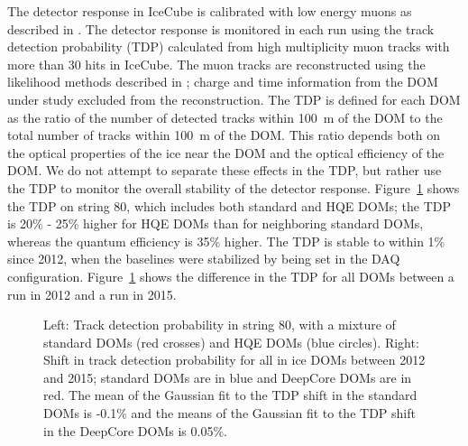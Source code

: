 The detector response in IceCube is calibrated with low energy muons as
described in \cite{IC3:ereco}. The detector response is monitored in each run using the track
detection probability (TDP) calculated from high
multiplicity muon tracks with more than 30 hits in IceCube. The muon
tracks are reconstructed using the likelihood methods described in
\cite{IC3:ereco}; charge and time information from the DOM under study excluded
from the reconstruction. The TDP is
defined for each DOM as the ratio of the number of detected tracks
within 100~m of the DOM to the total number of tracks within 100~m of
the DOM. This ratio depends both on the optical properties of the ice
near the DOM and the optical efficiency of the DOM. We do not attempt
to separate
these effects in the TDP, but rather use the TDP to monitor the
overall stability of the detector response. Figure~\ref{fig:tdp} shows the TDP on
string 80, which includes both standard and HQE DOMs; the TDP is
20\% - 25\% higher for HQE DOMs than for neighboring standard
DOMs, whereas the quantum efficiency is 35\% higher. The TDP is stable to within 1\% since 2012, when the baselines
were stabilized by being set in the DAQ configuration. Figure~\ref{fig:tdp} shows
the difference in the TDP for all DOMs between a run in 2012 and a run
in 2015.

\begin{figure}[!h]
  \captionsetup[subfigure]{labelformat=empty}
  \centering
  \caption{Left: Track detection probability in string 80, with a
    mixture of standard DOMs (red crosses) and HQE DOMs (blue
    circles). Right: Shift in track detection probability for all in
    ice DOMs between 2012 and 2015; standard DOMs are in blue and
    DeepCore DOMs are in red. The mean of the Gaussian fit to
    the TDP shift in the standard DOMs is -0.1\% and the means of the Gaussian fit to
    the TDP shift in the DeepCore DOMs is 0.05\%.}
  \label{fig:tdp}
\end{figure}


